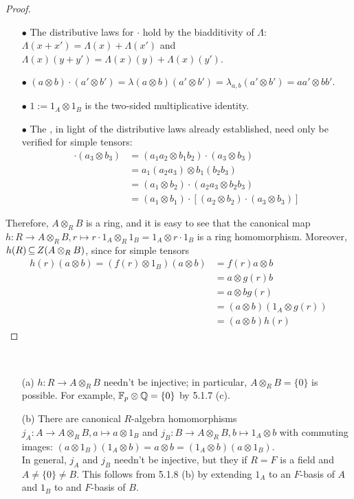 \documentclass[11pt]{book}
\theoremstyle{definition}   \newtheorem{defn}[counter]{Definition} %
\DeclareMathOperator{\ra}{\rightarrow}   \DeclareMathOperator{\Poly}{\mathbf{P}}   \DeclareMathOperator{\spn}{\textnormal{span}}   \DeclareMathOperator{\aut}{\textnormal{Aut}}
\newcommand{\vs}{\vspace{8pt}}
\numberwithin{counter}{chapter}
\begin{document}
\begin{proof}
\begin{enumerate}
\item[$\bullet$] The distributive laws for $\cdot$ hold by the biadditivity of $\Lambda$: $\Lambda(x + x') = \Lambda(x) + \Lambda(x')$ and $\Lambda(x)(y + y') = \Lambda(x)(y) + \Lambda(x)(y')$. 
\item[$\bullet$] $(a \otimes b) \cdot (a' \otimes b') = \lambda (a \otimes b)(a' \otimes b') = \lambda_{a,b}(a' \otimes b') = aa' \otimes bb'$. 
\item[$\bullet$] $1 := 1_A \otimes 1_B$ is the two-sided multiplicative identity.
\item[$\bullet$] The , in light of the distributive laws already established, need only be verified for simple tensors:
\begin{align*} 
[(a_1 \otimes b_1) \cdot (a_2 \otimes b_2)] \cdot (a_3 \otimes b_3) &= (a_1 a_2 \otimes b_1 b_2) \cdot (a_3 \otimes b_3) \\
&= a_1 (a_2 a_3) \otimes b_1 (b_2 b_3) \\
&= (a_1 \otimes b_2) \cdot (a_2 a_3 \otimes b_2 b_3) \\
&= (a_1 \otimes b_1) \cdot [(a_2 \otimes b_2) \cdot (a_3 \otimes b_3)]
\end{align*} 
\end{enumerate}
Therefore, $A \otimes_R B$ is a ring, and it is easy to see that the canonical map $h : R \ra A \otimes_R B, r \mapsto r \cdot 1_A \otimes_R 1_B = 1_A \otimes r \cdot 1_B$ is a ring homomorphism. Moreover, $h(R) \operatorname{\subseteq} Z(A \otimes_R B)$, since for simple tensors
	\begin{align*} 
	h(r) (a \otimes b) = (f(r) \otimes 1_B)(a \otimes b) &= f(r) a \otimes b \\
	&= a \otimes g(r) b \\
	&= a \otimes b g(r) \\
	&= (a \otimes b)(1_A \otimes g(r)) \\
	&= (a \otimes b) h(r) 
	\end{align*} 
\end{proof}

\vs

\begin{remark}\ 
\begin{enumerate}
\item[(a)] $h : R \ra A \otimes_R B$ needn't be injective; in particular, $A \otimes_R B = \{0\}$ is possible. For example, $\mathbb{F}_p \otimes \operatorname{\mathbb{Q}} = \{0\}$ by 5.1.7 (c).
\item[(b)] There are canonical $R$-algebra homomorphisms $j_A : A \ra A \otimes_R B, a \mapsto a \otimes 1_B$ and $j_B : B \ra A \otimes_R B, b \mapsto 1_A \otimes b$ with commuting images: $(a \otimes 1_B)(1_A \otimes b) = a \otimes b = (1_A \otimes b)(a \otimes 1_B)$. \\

In general, $j_A$ and $j_B$ needn't be injective, but they  if $R = F$ is a field and $A \ne \{0\} \ne B$. This follows from 5.1.8 (b) by extending $1_A$ to an $F$-basis of $A$ and $1_B$ to and $F$-basis of $B$. 
\end{enumerate}
\end{remark}
\end{document}
